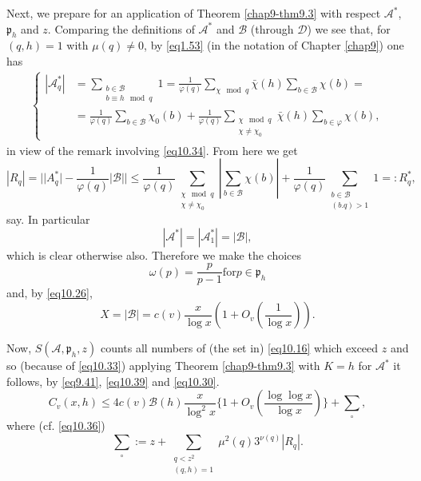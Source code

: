 Next, we prepare for an application of Theorem \ref{chap9-thm9.3} with
respect $\mathscr{A}^*$, $\mathfrak{p}_h$ and $z$. Comparing the
definitions of $\mathscr{A}^*$ and $\mathscr{B}$ (through $\mathscr{D}$) we
see that, for $(q,h)=1$ with $\mu (q) \neq 0$, by \eqref{eq1.53} (in the
notation of Chapter \ref{chap9}) one has  
\begin{align*}
\begin{cases}
|\mathscr{A}^*_q| & = \sum\limits_{\substack{b \in \mathscr{B} \\ b \equiv h
    \mod q}}1 = \frac{1}{\varphi(q)} \sum\limits_{\chi \mod q}
\bar{\chi}(h) \sum\limits_{b \in \mathscr{B}}\chi (b)=\\ 
& =\frac{1}{\varphi (q)} \sum\limits_{b \in \mathscr{B}}\chi_0 (b) +
\frac{1}{\varphi (q)} \sum\limits_{\substack{\chi \mod q \\ \chi \neq
    \chi_0}} \bar{\chi}(h) \sum\limits_{b \in \varphi} \chi(b),  
\end{cases}\tag{10.35}\label{eq10.35}
\end{align*}
in view of the remark involving \eqref{eq10.34}. From here we get
 \begin{equation*}
|R_q|= || A^*_q \Big|- \frac{1}{\varphi (q)}|\mathscr{B}| \Big| \leq
\frac{1}{\varphi  (q)} \sum_{\substack{\chi \mod q \\ \chi \neq
    \chi_0}} |\sum_{b \in   \mathscr{B}} \chi (b)|+
\frac{1}{\varphi(q)} \sum_{\substack{b \in 
    \mathscr{B} \\ (b.q)> 1}} 1 = :  R^*_q, \tag{10.36}\label{eq10.36} 
\end{equation*} 
say. In particular
\begin{equation*}
|\mathscr{A}^*| = |\mathscr{A}^*_1|= |\mathscr{B}|,
\tag{10.37}\label{eq10.37} 
 \end{equation*} 
 which is clear otherwise also. Therefore we make the choices
 \begin{equation*}
\omega (p) = \frac{p}{p-1} \text{for} p \in \mathfrak{p}_h
\tag{10.38}\label{eq10.38} 
\end{equation*} 
and, by \eqref{eq10.26},
\begin{equation*}
X= |\mathscr{B} | = c(v) \frac{x}{\log x} (1 + O_v (\frac{1}{\log
  x})). \tag{10.39}\label{eq10.39} 
\end{equation*} 
 
Now, $S(\mathscr{A}, \mathfrak{p}_h, z)$ counts all numbers of (the
set in) \eqref{eq10.16} which exceed $z$ and so (because of
\eqref{eq10.33}) applying Theorem \ref{chap9-thm9.3} with $K = h$ for
$\mathscr{A}^*$ it follows, by \eqref{eq9.41},\pageoriginale
\eqref{eq10.39} and \eqref{eq10.30}. 
 \begin{equation*}
C_v (x,h)\leq 4c (v) \mathscr{B} (h) \frac{x}{\log^2 x} \{ 1+O_v (\frac{\log
  \log x}{\log x})\}+ \sum_\circ,\tag{10.40}\label{eq10.40} 
 \end{equation*} 
 where (cf. \eqref{eq10.36})
 \begin{equation*}
\sum_\circ := z+ \sum_{\substack{q < z^2 \\ (q, h)=1}} \mu^2 (q) 3^{\nu
  (q)}|R_q|. \tag{10.41}\label{eq10.41}
 \end{equation*}
 
